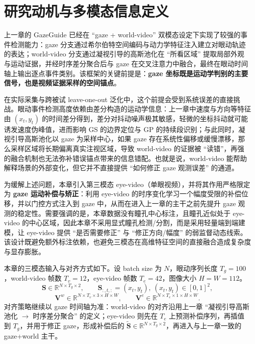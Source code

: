 \documentclass{xdupgthesis}
\newcommand{\ModelMM}{GazeGuide}
\begin{document}
\section{研究动机与多模态信息定义}

上一章的 \ModelMM{} 已经在 ``gaze + world-video'' 双模态设定下实现了较强的事件检测能力：gaze 分支通过希尔伯特空间编码与动力学特征注入建立对眼动轨迹的表达；world-video 分支通过凝视引导的高斯池化在 ``所看区域'' 提取局部外观与运动证据，并经时序差分聚合后与 gaze 在交叉注意力中融合，最终在眼动时间轴上输出逐点事件类别。该框架的关键前提是：\textbf{gaze 坐标既是运动学判别的主要信号，也是视频证据采样的空间锚点}。

在实际采集与跨被试 leave-one-out 泛化中，这个前提会受到系统误差的直接挑战。眼动事件检测高度依赖由差分构造的运动学信息：上一章中速度与方向等特征由 $(x_t,y_t)$ 的时间差分得到，差分对抖动噪声极其敏感，轻微的坐标抖动就可能诱发速度伪峰值，进而影响 GS 的边界定位与 GP 的持续段识别；与此同时，凝视引导高斯池化以 gaze 为采样中心，如果 gaze 存在系统性偏移或缓慢漂移，那么采样区域将长期偏离真实注视区域，导致 world-video 的证据被 ``读错''，再强的融合机制也无法弥补错误锚点带来的信息错配。也就是说，world-video 能帮助解释场景的外部变化，但它并不直接提供 ``如何修正 gaze 观测误差'' 的通道。

为缓解上述问题，本章引入第三模态 eye-video（单眼视频），并将其作用严格限定为 \textbf{gaze 运动补偿与矫正}：利用 eye-video 的时序变化学习一个幅度受限的补偿位移，并以门控方式注入到 gaze 中，从而在进入上一章的主干之前先提升 gaze 观测的稳定性。需要强调的是，本章数据没有瞳孔中心标注，且瞳孔近似处于 eye-video 的中心区域，因此本章不采用显式瞳孔检测/分割，而是采用轻量端到端建模，让 eye-video 提供 ``是否需要修正'' 与 ``修正方向/幅度'' 的弱监督动态线索。该设计既避免额外标注依赖，也避免三模态在高维特征空间的直接融合造成复杂度与显存膨胀。

本章的三模态输入与对齐方式如下。设 batch size 为 $N$，眼动序列长度 $T_g=100$，world-video 帧数 $T_v=12$，eye-video 帧数 $T_e=42$，图像大小 $H=W=112$。
\begin{equation}
\mathbf{S}\in\mathbb{R}^{N\times T_g\times 2},\qquad \mathbf{S}_{:,t,:}=(x_t,y_t),\ (x_t,y_t)\in[0,1]^2,
\end{equation}
\begin{equation}
\mathbf{V}^w\in\mathbb{R}^{N\times T_v\times 3\times H\times W},\qquad
\mathbf{V}^e\in\mathbb{R}^{N\times T_e\times 1\times H\times W}.
\end{equation}
对齐策略继续以 gaze 时间轴为准：world-video 的对齐沿用上一章 ``凝视引导高斯池化 $\rightarrow$ 时序差分聚合'' 的定义；eye-video 则先在 $T_e$ 上预测补偿序列，再插值到 $T_g$，并用于修正 gaze，形成补偿后的 $\tilde{\mathbf{S}}\in\mathbb{R}^{N\times T_g\times 2}$，再进入与上一章一致的 gaze+world 主干。
\end{document}

